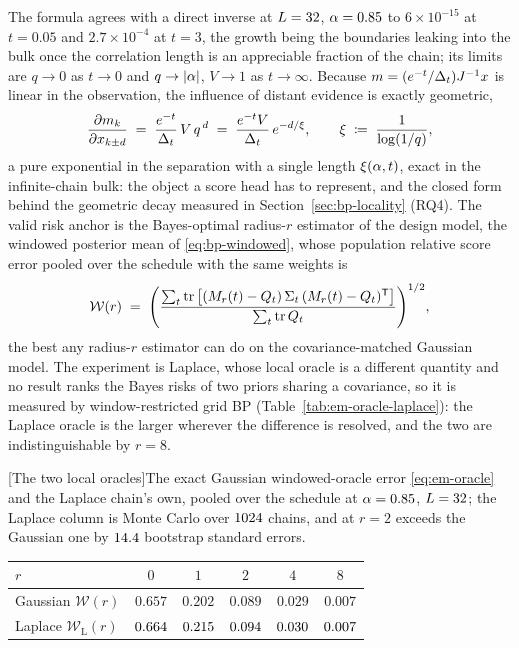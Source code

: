 \noindent The formula agrees with a direct inverse at $L = 32$,
$\alpha = 0.85$ to $6\times10^{-15}$ at $t = 0.05$ and $2.7\times10^{-4}$ at
$t = 3$, the growth being the boundaries leaking into the bulk once the
correlation length is an appreciable fraction of the chain; its limits are
$q \to 0$ as $t \to 0$ and $q \to |\alpha|$, $V \to 1$ as $t \to \infty$.
Because $m = (e^{-t}/\Delta_t)J^{-1}x$ is linear in the observation, the
influence of distant evidence is exactly geometric,
\begin{equation}
  \frac{\partial m_k}{\partial x_{k \pm d}}
  \;=\; \frac{e^{-t}}{\Delta_t}\, V\, q^{\,d}
  \;=\; \frac{e^{-t} V}{\Delta_t}\, e^{-d/\xi},
  \qquad
  \xi \;\coloneqq\; \frac{1}{\log(1/q)} ,
  \label{eq:em-influence}
\end{equation}
a pure exponential in the separation with a single length $\xi(\alpha,t)$,
exact in the infinite-chain bulk: the object a score head has to represent,
and the closed form behind the geometric decay measured in
Section~\ref{sec:bp-locality} (RQ4). The valid risk anchor is the
Bayes-optimal radius-$r$ estimator of the design model, the windowed
posterior mean of \eqref{eq:bp-windowed}, whose population relative score
error pooled over the schedule with the same weights is
\begin{equation}
  \mathcal{W}(r)
  \;=\;
  \Bigg(
  \frac{\sum_{t} \operatorname{tr}\big[(M_r(t)-Q_t)\,\Sigma_t\,(M_r(t)-Q_t)^{\mathsf{T}}\big]}
       {\sum_{t} \operatorname{tr}Q_t}
  \Bigg)^{1/2},
  \label{eq:em-oracle}
\end{equation}
the best any radius-$r$ estimator can do on the covariance-matched Gaussian
model. The experiment is Laplace, whose local oracle is a different quantity
and no result ranks the Bayes risks of two priors sharing a covariance, so it
is measured by window-restricted grid BP (Table~\ref{tab:em-oracle-laplace}):
the Laplace oracle is the larger wherever the difference is resolved, and
the two are indistinguishable by $r = 8$.

\begin{center}
\begin{minipage}{\linewidth}\small\centering
{}[The two local oracles]{The exact Gaussian windowed-oracle
error \eqref{eq:em-oracle} and the Laplace chain's own, pooled over the
schedule at $\alpha = 0.85$, $L = 32$; the Laplace column is Monte Carlo
over $1024$ chains, and at $r = 2$ exceeds the Gaussian one by
$14.4$ bootstrap standard errors.}
\label{tab:em-oracle-laplace}
\begin{tabular}{@{}lccccc@{}}
\toprule
$r$ & $0$ & $1$ & $2$ & $4$ & $8$ \\
\midrule
Gaussian $\mathcal{W}(r)$ & $0.657$ & $0.202$ & $0.089$ & $0.029$ & $0.007$ \\
Laplace $\mathcal{W}_{\mathrm{L}}(r)$
  & $0.664$ & $0.215$ & $0.094$
  & $0.030$ & $0.007$ \\
\bottomrule
\end{tabular}
\end{minipage}
\end{center}

